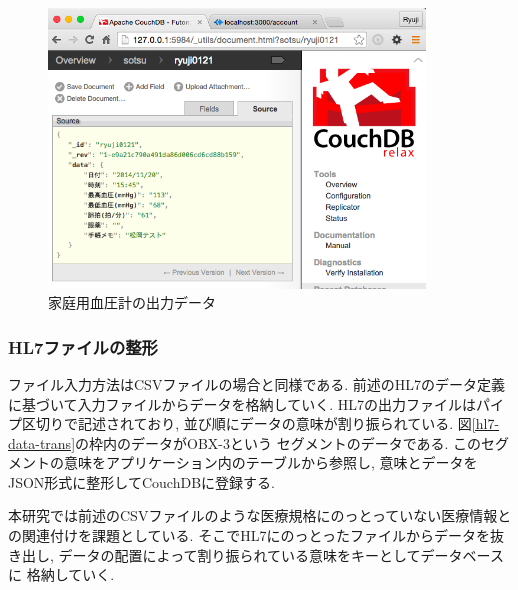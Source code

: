 			\begin{figure}[htbp]
				\begin{center}
					\includegraphics[width=10cm, bb=0 0 640 475]{./gazou/blood-data-couch.png}
				\end{center}
				\caption{家庭用血圧計の出力データ}
				\label{blood-data-couch}
			\end{figure}

		\subsubsection{HL7ファイルの整形}
			ファイル入力方法はCSVファイルの場合と同様である.
			前述のHL7のデータ定義に基づいて入力ファイルからデータを格納していく.
			HL7の出力ファイルはパイプ区切りで記述されており,
			並び順にデータの意味が割り振られている.
			図\ref{hl7-data-trans}の枠内のデータがOBX-3という
			セグメントのデータである.
			このセグメントの意味をアプリケーション内のテーブルから参照し,
			意味とデータをJSON形式に整形してCouchDBに登録する.


			本研究では前述のCSVファイルのような医療規格にのっとっていない医療情報との関連付けを課題としている.
			そこでHL7にのっとったファイルからデータを抜き出し,
			データの配置によって割り振られている意味をキーとしてデータベースに
			格納していく.

